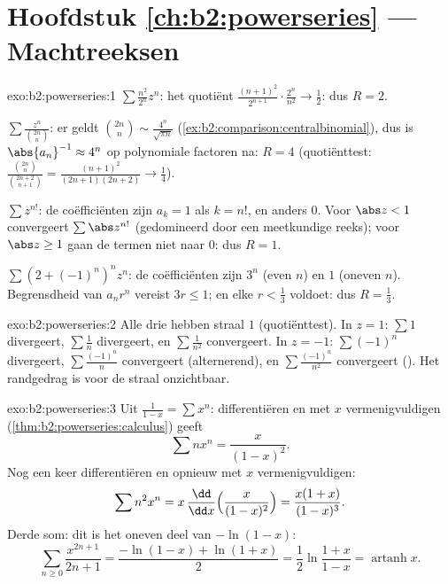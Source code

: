 \section*{Hoofdstuk \ref{ch:b2:powerseries} --- Machtreeksen}

\begin{solution}{exo:b2:powerseries:1}
$\sum \frac{n^2}{2^n}z^n$: het quotiënt
$\frac{(n+1)^2}{2^{n+1}}\cdot \frac{2^n}{n^2} \to \frac12$: dus $R
= 2$.

$\sum \frac{z^n}{\binom{2n}{n}}$: er geldt $\binom{2n}{n} \sim
\frac{4^n}{\sqrt{\pi n}}$
(\cref{ex:b2:comparison:centralbinomial}), dus is $\abs{a_n}^{-1}
\approx 4^n$ op polynomiale factoren na: $R = 4$ (quotiënttest:
$\frac{\binom{2n}{n}}{\binom{2n+2}{n+1}} =
\frac{(n+1)^2}{(2n+1)(2n+2)} \to \frac14$).

$\sum z^{n!}$: de coëfficiënten zijn $a_k = 1$ als $k = n!$, en
anders $0$. Voor $\abs z < 1$ convergeert $\sum \abs z^{n!}$
(gedomineerd door een meetkundige reeks); voor $\abs z \geq 1$ gaan
de termen niet naar $0$: dus $R = 1$.

$\sum (2 + (-1)^n)^n z^n$: de coëfficiënten zijn $3^n$ (even $n$)
en $1$ (oneven $n$). Begrensdheid van $a_nr^n$ vereist $3r \leq 1$;
en elke $r < \frac13$ voldoet: dus $R = \frac13$.
\end{solution}

\begin{solution}{exo:b2:powerseries:2}
Alle drie hebben straal $1$ (quotiënttest). In $z = 1$: $\sum 1$
divergeert, $\sum\frac1n$ divergeert, en $\sum\frac{1}{n^2}$
convergeert. In $z = -1$: $\sum(-1)^n$ divergeert,
$\sum\frac{(-1)^n}{n}$ convergeert (alternerend), en
$\sum\frac{(-1)^n}{n^2}$ convergeert (). Het randgedrag is
voor de straal onzichtbaar.
\end{solution}

\begin{solution}{exo:b2:powerseries:3}
Uit $\frac{1}{1-x} = \sum x^n$: differentiëren en met $x$
vermenigvuldigen (\cref{thm:b2:powerseries:calculus}) geeft
\[
\sum n x^n = \frac{x}{(1-x)^2} .
\]
Nog een keer differentiëren en opnieuw met $x$ vermenigvuldigen:
\[
\sum n^2 x^n = x\,\frac{\dd}{\dd x}\Bigl(\frac{x}{(1-x)^2}\Bigr)
= \frac{x(1 + x)}{(1-x)^3} .
\]
Derde som: dit is het oneven deel van $-\ln(1 - x)$:
\[
\sum_{n\geq0} \frac{x^{2n+1}}{2n+1}
= \frac{-\ln(1-x) + \ln(1+x)}{2}
= \frac12 \ln\frac{1+x}{1-x}
= \operatorname{artanh} x .
\]
\end{solution}

